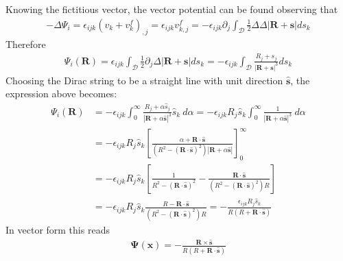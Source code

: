 \documentclass[10pt]{report}
\begin{document}
{Knowing the fictitious vector, the vector potential can be found observing that  
\begin{align}
-\Delta \Psi_i=\epsilon_{ijk}(v_k+v^f_k)_{,j}=\epsilon_{ijk}v^f_{k,j}=-\epsilon_{ijk}\partial_j\int_\mathcal{D}\frac{1}{2}\Delta\Delta |\mathbf{R}+\mathbf{s}|ds_k
\end{align}
Therefore
\begin{align}
\Psi_i(\mathbf R)=\epsilon_{ijk}\int_\mathcal{D}\frac{1}{2}\partial_j\Delta |\mathbf{R}+\mathbf{s}|ds_k=-\epsilon_{ijk}\int_\mathcal{D}\frac{R_j+s_j}{|\mathbf{R}+\mathbf{s}|^3}ds_k
\end{align}
Choosing the Dirac string to be a straight line with unit direction $\hat{\mathbf{s}}$, the expression above becomes:
\begin{align}
\Psi_i(\mathbf R)&
=-\epsilon_{ijk}\int_0^\infty\frac{R_j+\alpha \hat{s}_j}{|\mathbf{R}+\alpha\hat{\mathbf{s}}|^3}\hat{s}_k\ d\alpha
=-\epsilon_{ijk}R_j\hat{s}_k\int_0^\infty\frac{1}{|\mathbf{R}+\alpha\hat{\mathbf{s}}|^3}\ d\alpha\nonumber\\
&=-\epsilon_{ijk}R_j\hat{s}_k\left[\frac{\alpha+\mathbf{R}\cdot\hat{\mathbf{s}}}{\left(R^2-(\mathbf{R}\cdot\hat{\mathbf{s}})^2\right)|\mathbf R+\alpha\hat{\mathbf s}|}\right]_0^\infty\nonumber\\
&=-\epsilon_{ijk}R_j\hat{s}_k\left[\frac{1}{R^2-(\mathbf{R}\cdot\hat{\mathbf{s}})^2}
-\frac{\mathbf{R}\cdot\hat{\mathbf{s}}}{\left(R^2-(\mathbf{R}\cdot\hat{\mathbf{s}})^2\right)R}\right]\nonumber\\
&=-\epsilon_{ijk}R_j\hat{s}_k
\frac{R-\mathbf{R}\cdot\hat{\mathbf{s}}}{\left(R^2-(\mathbf{R}\cdot\hat{\mathbf{s}})^2\right)R}
=-\frac{\epsilon_{ijk}R_j\hat{s}_k}{R\left(R+\mathbf{R}\cdot\hat{\mathbf{s}}\right)}
\end{align}
In vector form this reads
\begin{align}
\mathbf{\Psi}(\mathbf{x})=-\frac{\mathbf{R}\times\hat{\mathbf{s}}}{R\left(R+\mathbf{R}\cdot\hat{\mathbf{s}}\right)}
\end{align}

}
\end{document}
